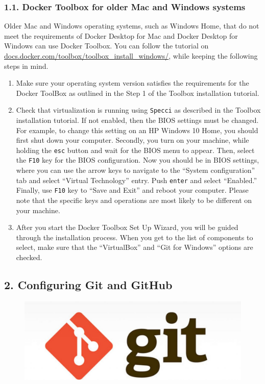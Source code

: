 	
\subsubsection*{1.1. Docker Toolbox for older Mac and Windows systems}
Older Mac and Windows operating systems, such as Windows Home, that do not meet the requirements of Docker Desktop for Mac and Docker Desktop for Windows can use Docker Toolbox. You can follow the tutorial on \url{docs.docker.com/toolbox/toolbox_install_windows/}, while keeping the following steps in mind.

\begin{enumerate}
	\item Make sure your operating system version satisfies the requirements for the Docker ToolBox as outlined in the Step 1 of the Toolbox installation tutorial.
	\item Check that virtualization is running using {\tt Specci} as described in the Toolbox installation tutorial. If not enabled, then the BIOS settings must be changed. For example, to change this setting on an HP Windows 10 Home, you should first shut down your computer. Secondly, you turn on your machine, while holding the {\tt esc} button and wait for the BIOS menu to appear. Then, select the {\tt F10} key for the BIOS configuration. Now you should be in BIOS settings, where you can use the arrow keys to navigate to the ``System configuration'' tab and select ``Virtual Technology'' entry. Push {\tt enter} and select ``Enabled.'' Finally, use {\tt F10} key to ``Save and Exit'' and reboot your computer. Please note that the specific keys and operations are most likely to be different on your machine.
	\item After you start the Docker Toolbox Set Up Wizard, you will be guided through the installation process. When you get to the list of components to select, make sure that the ``VirtualBox''  and ``Git for Windows'' options are checked.
	
\end{enumerate}


\subsection*{2. Configuring Git and GitHub}
\begin{figure}[ht!]
	\begin{center}
	 \includegraphics[scale=.15]{graphics/git.jpg}
	\end{center}
\end{figure}

